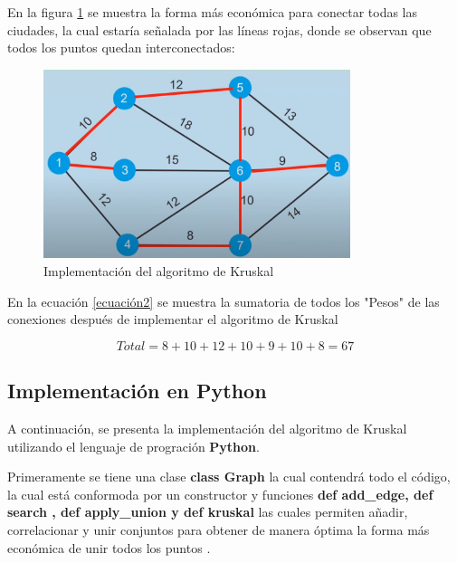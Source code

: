 \documentclass[12pt,a4paper]{article}
\begin{document}
En la figura \ref{fig:ejemplo2} se muestra la forma más económica para conectar todas las ciudades, la cual estaría señalada por las líneas rojas, donde se observan que todos los puntos quedan interconectados:


\begin{figure}[h!]
\centering
\includegraphics[width=0.8\textwidth]{Ejemplo2.jpg}
\caption{\label{fig:ejemplo2}Implementación del algoritmo de Kruskal}
\end{figure}
\newpage
En la ecuación \ref{ecuación2} se muestra la sumatoria de todos los "Pesos" de las conexiones después de implementar el algoritmo de Kruskal

\begin{equation}
\label{ecuación2}
    Total = 8+10+12+10+9+10+8 = 67
\end{equation}

\subsection{Implementación en Python}

A continuación, se presenta la implementación del algoritmo de Kruskal utilizando el lenguaje de progración \textbf{Python}.

Primeramente se tiene una clase  \textbf{class Graph} la cual contendrá todo el código, la cual está conformoda por un constructor y funciones \textbf{def add\_edge, def search , def apply\_union y def kruskal} las cuales permiten añadir, correlacionar y unir conjuntos para obtener de manera óptima la forma más económica de unir todos los puntos \cite{algoritmo}.
\end{document}
